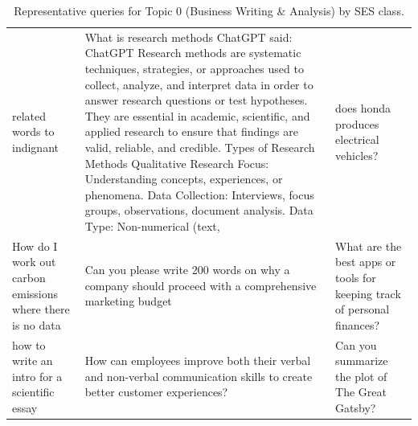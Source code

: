 \begin{table}[ht]
\begin{tabular}{p{4.3cm}p{4.3cm}p{4.3cm}}
related words to indignant & What is research methods  ChatGPT said: ChatGPT Research methods are systematic techniques, strategies, or approaches used to collect, analyze, and interpret data in order to answer research questions or test hypotheses. They are essential in academic, scientific, and applied research to ensure that findings are valid, reliable, and credible.  Types of Research Methods Qualitative Research Focus: Understanding concepts, experiences, or phenomena. Data Collection: Interviews, focus groups, observations, document analysis. Data Type: Non-numerical (text, & does honda produces electrical vehicles? \\[4pt]
How do I work out carbon emissions where there is no data & Can you please write 200 words on why a company should proceed with a comprehensive marketing budget & What are the best apps or tools for keeping track of personal finances? \\[4pt]
how to write an intro for a scientific essay & How can employees improve both their verbal and non-verbal communication skills to create better customer experiences? & Can you summarize the plot of The Great Gatsby? \\[4pt]
\bottomrule
\end{tabular}
\caption{Representative queries for Topic 0 (Business Writing \& Analysis) by SES class.}
\label{tab:repr_queries_topic0}
\end{table}

